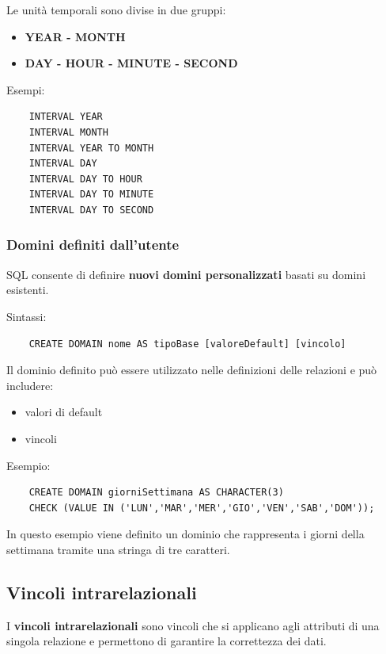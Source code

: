 Le unità temporali sono divise in due gruppi:

\begin{itemize}
	
	\item \textbf{YEAR - MONTH}
	
	\item \textbf{DAY - HOUR - MINUTE - SECOND}
	
\end{itemize}

Esempi:

\begin{verbatim}
	INTERVAL YEAR
	INTERVAL MONTH
	INTERVAL YEAR TO MONTH
	INTERVAL DAY
	INTERVAL DAY TO HOUR
	INTERVAL DAY TO MINUTE
	INTERVAL DAY TO SECOND
\end{verbatim}

\subsubsection*{Domini definiti dall'utente}

SQL consente di definire \textbf{nuovi domini personalizzati} basati su domini esistenti.

Sintassi:

\begin{verbatim}
	CREATE DOMAIN nome AS tipoBase [valoreDefault] [vincolo]
\end{verbatim}

Il dominio definito può essere utilizzato nelle definizioni delle relazioni e può includere:

\begin{itemize}
	\item valori di default
	\item vincoli
\end{itemize}

Esempio:

\begin{verbatim}
	CREATE DOMAIN giorniSettimana AS CHARACTER(3)
	CHECK (VALUE IN ('LUN','MAR','MER','GIO','VEN','SAB','DOM'));
\end{verbatim}

In questo esempio viene definito un dominio che rappresenta i giorni della settimana tramite una stringa di tre caratteri.
\subsection{Vincoli intrarelazionali}

I \textbf{vincoli intrarelazionali} sono vincoli che si applicano agli attributi
di una singola relazione e permettono di garantire la correttezza dei dati.

